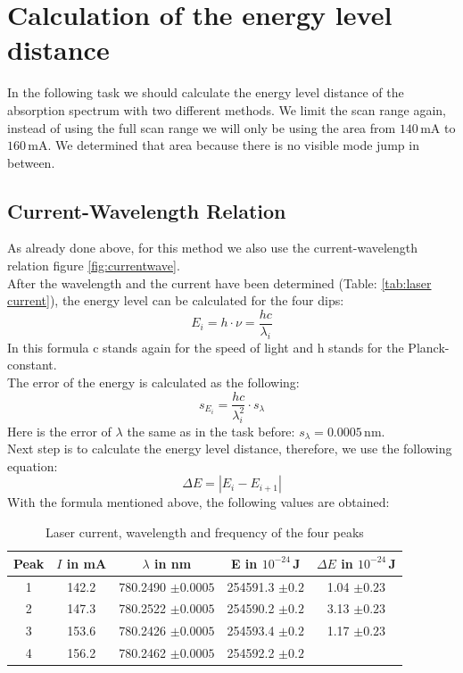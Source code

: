 \section{Calculation of the energy level distance}
In the following task we should calculate the energy level distance of the absorption spectrum with two 
different methods. 
We limit the scan range again, instead of using the full scan range we will only 
be using the area from $140\,$mA to $160\,$mA. We determined that area because there is 
no visible mode jump in between. \\
\subsection{Current-Wavelength Relation}
As already done above, for this method we also use the current-wavelength relation figure \ref{fig:currentwave}.\\
After the wavelength and the current have been determined (Table: \ref{tab:laser current}), the energy level can be calculated for the four dips:
\begin{equation}
    E_i = h \cdot \nu = \frac{h c}{\lambda_i}
\end{equation}
In this formula c stands again for the speed of light and h stands for the Planck-constant. \\
The error of the energy is calculated as the following:
\begin{equation}
    s_{E_i} = \frac{hc}{\lambda_i^2} \cdot s_{\lambda}
\end{equation}
Here is the error of $\lambda$ the same as in the task before: $s_{\lambda}=0.0005\,$nm.\\
Next step is to calculate the energy level distance, therefore, we use the following equation:
\begin{equation}
    \Delta E = |E_i - E_{i+1}|
\end{equation}
With the formula mentioned above, the following values are obtained:
\begin{table}[h]
    \centering
        \begin{tabular}{c||c|c|c|c}
            Peak & $I$ in mA & $\lambda$ in nm & E in $10^{-24}\,$J & $\Delta E$ in $10^{-24}\,$J\\
            \hline
          1 & 142.2 & 780.2490 $\pm  0.0005$ & 254591.3 $\pm  0.2$ & 1.04 $\pm  0.23$\\
          2 & 147.3 & 780.2522 $\pm  0.0005$ & 254590.2 $\pm  0.2$ & 3.13 $\pm  0.23$\\
          3 & 153.6 & 780.2426 $\pm  0.0005$ & 254593.4 $\pm  0.2$ & 1.17 $\pm  0.23$\\
          4 & 156.2 & 780.2462 $\pm  0.0005$ & 254592.2 $\pm  0.2$ & \\
        \end{tabular}%
        \caption{Laser current, wavelength and frequency of the four peaks}
        \label{tab:A2data}%
    \end{table}\\
